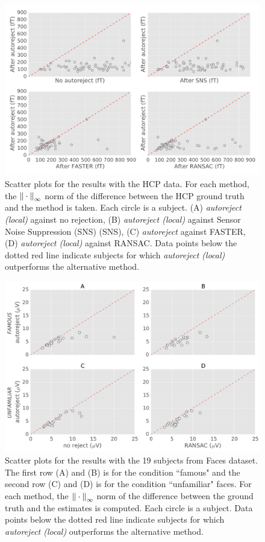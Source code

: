 \begin{figure}[htb!]
    \centering
    \includegraphics[width=0.8\linewidth]{figures/figure4.pdf}
    \caption[Scatter plots for the results with the HCP data.]{Scatter plots for the results with the HCP data. For each method, the ${\| \cdot \|}_{\mathrm{\infty}}$ norm of the difference between the HCP ground truth and the method is taken. Each circle is a subject. (A) \textit{autoreject (local)} against no rejection, (B) \textit{autoreject (local)} against Sensor Noise Suppression (SNS) (SNS), (C) \textit{autoreject} against FASTER, (D) \textit{autoreject (local)} against RANSAC. Data points below the dotted red line indicate subjects for which \textit{autoreject (local)} outperforms the alternative method.}
    \label{fig:hcp_scatter}
\end{figure}

\begin{figure}[htb!]
    \centering
    \includegraphics[width=0.8\linewidth]{figures/figure7.pdf}
    \caption[Scatter plots for the results with the 19 subjects from Faces dataset.]{Scatter plots for the results with the 19 subjects from Faces dataset. The first row (A) and (B) is for the condition ``famous" and the second row (C) and (D) is for the condition ``unfamiliar" faces. For each method, the ${\| \cdot \|}_{\mathrm{\infty}}$ norm of the difference between the ground truth and the estimates is computed. Each circle is a subject. Data points below the dotted red line indicate subjects for which \textit{autoreject (local)} outperforms the alternative method.}
    \label{fig:dgw_scatter}
\end{figure}

